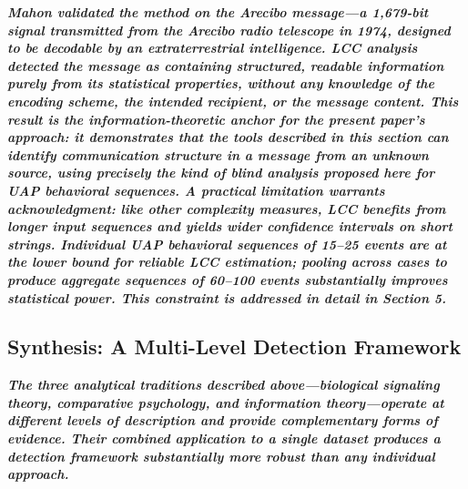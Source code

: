 \documentclass[11pt,letterpaper]{article}
\begin{document}
\textbf{\textit{Mahon validated the method on the Arecibo message---a 1,679-bit signal transmitted from the Arecibo radio telescope in 1974, designed to be decodable by an extraterrestrial intelligence. LCC analysis detected the message as containing structured, readable information }}\textbf{\textit{purely from its statistical properties}}\textbf{\textit{, without any knowledge of the encoding scheme, the intended recipient, or the message content. This result is the information-theoretic anchor for the present paper's approach: it demonstrates that the tools described in this section can identify communication structure in a message from an unknown source, using precisely the kind of blind analysis proposed here for UAP behavioral sequences. A practical limitation warrants acknowledgment: like other complexity measures, LCC benefits from longer input sequences and yields wider confidence intervals on short strings. Individual UAP behavioral sequences of 15--25 events are at the lower bound for reliable LCC estimation; pooling across cases to produce aggregate sequences of 60--100 events substantially improves statistical power. This constraint is addressed in detail in Section 5.}}


\subsection{Synthesis: A Multi-Level Detection Framework}

\textbf{\textit{The three analytical traditions described above---biological signaling theory, comparative psychology, and information theory---operate at different levels of description and provide complementary forms of evidence. Their combined application to a single dataset produces a detection framework substantially more robust than any individual approach.}}
\end{document}
